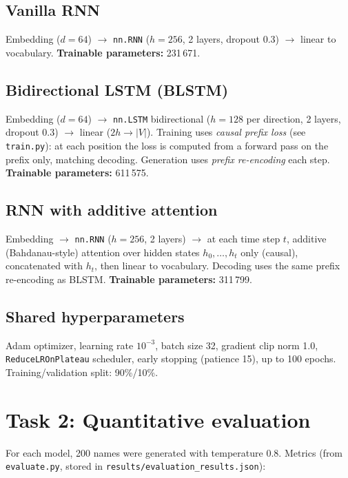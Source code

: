 \documentclass[11pt,a4paper]{article}
\begin{document}
\subsection{Vanilla RNN}
Embedding ($d=64$) $\rightarrow$ \texttt{nn.RNN} ($h=256$, 2 layers, dropout 0.3)
$\rightarrow$ linear to vocabulary. \textbf{Trainable parameters:} 231\,671.

\subsection{Bidirectional LSTM (BLSTM)}
Embedding ($d=64$) $\rightarrow$ \texttt{nn.LSTM} bidirectional ($h=128$ per direction,
2 layers, dropout 0.3) $\rightarrow$ linear ($2h \rightarrow |V|$).
Training uses \emph{causal prefix loss} (see \texttt{train.py}): at each position the
loss is computed from a forward pass on the prefix only, matching decoding.
Generation uses \emph{prefix re-encoding} each step.
\textbf{Trainable parameters:} 611\,575.

\subsection{RNN with additive attention}
Embedding $\rightarrow$ \texttt{nn.RNN} ($h=256$, 2 layers) $\rightarrow$ at each time
step $t$, additive (Bahdanau-style) attention over hidden states $h_0,\ldots,h_t$ only
(causal), concatenated with $h_t$, then linear to vocabulary. Decoding uses the same
prefix re-encoding as BLSTM.
\textbf{Trainable parameters:} 311\,799.

\subsection{Shared hyperparameters}
Adam optimizer, learning rate $10^{-3}$, batch size 32, gradient clip norm 1.0,
\texttt{ReduceLROnPlateau} scheduler, early stopping (patience 15), up to 100 epochs.
Training/validation split: 90\%/10\%.


\section{Task 2: Quantitative evaluation}
For each model, 200 names were generated with temperature $0.8$.
Metrics (from \texttt{evaluate.py}, stored in \texttt{results/evaluation\_results.json}):
\end{document}
